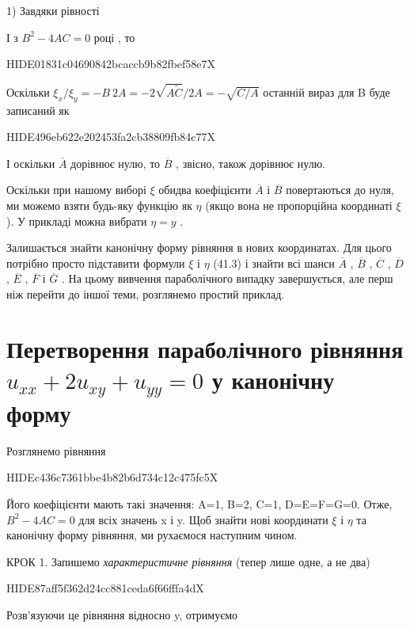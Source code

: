 \documentclass[
  ukrainian,
]{article}
\begin{document}
1) Завдяки рівності

І з \(B^2 - 4AC = 0\) році , то

HIDE01831c04690842bcaccb9b82fbef58e7X

Оскільки
\(\xi_x/\xi_y = -B \ 2A = -2 \sqrt{A\tilde{C}}/2A = -\sqrt{C/A}\)
останній вираз для B буде записаний як

HIDE496eb622e202453fa2cb38809fb84c77X

І оскільки \(\overline{A}\) дорівнює нулю, то \(\overline{B}\) , звісно,
також дорівнює нулю.

Оскільки при нашому виборі \(\xi\) обидва коефіцієнти \(\overline{A}\) і
\(\overline{B}\) повертаються до нуля, ми можемо взяти будь-яку функцію
як \(\eta\) (якщо вона не пропорційна координаті \(\xi\) ). У прикладі
можна вибрати \(\eta = y\) .

Залишається знайти канонічну форму рівняння в нових координатах. Для
цього потрібно просто підставити формули \(\xi\) і \(\eta\) (41.3) і
знайти всі шанси \(\overline{A}\) , \(\overline{B}\) , \(\overline{C}\)
, \(\overline{D}\) , \(\overline{E}\) , \(\overline{F}\) і
\(\overline{G}\) . На цьому вивчення параболічного випадку завершується,
але перш ніж перейти до іншої теми, розглянемо простий приклад.

\section{\texorpdfstring{Перетворення параболічного рівняння
\(u_{xx} + 2u_{xy} + u_{yy} = 0\) у канонічну
форму}{Перетворення параболічного рівняння u\_\{xx\} + 2u\_\{xy\} + u\_\{yy\} = 0 у канонічну форму}}\label{ux43fux435ux440ux435ux442ux432ux43eux440ux435ux43dux43dux44f-ux43fux430ux440ux430ux431ux43eux43bux456ux447ux43dux43eux433ux43e-ux440ux456ux432ux43dux44fux43dux43dux44f-u_xx-2u_xy-u_yy-0-ux443-ux43aux430ux43dux43eux43dux456ux447ux43dux443-ux444ux43eux440ux43cux443}

Розглянемо рівняння

HIDEc436c7361bbe4b82b6d734c12c475fc5X

Його коефіцієнти мають такі значення: A=1, B=2, C=1, D=E=F=G=0. Отже,
\(B^2-4AC=0\) для всіх значень x і y. Щоб знайти нові координати \(\xi\)
і \(\eta\) та канонічну форму рівняння, ми рухаємося наступним чином.

КРОК 1. Запишемо \emph{характеристичне рівняння} (тепер лише одне, а не
два)

HIDE87aff5f362d24cc881ceda6f66fffa4dX

Розв'язуючи це рівняння відносно y, отримуємо
\end{document}
